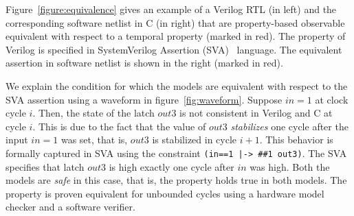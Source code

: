 \begin{example}
%
Figure~\ref{figure:equivalence} gives an example of a Verilog RTL (in left) and 
the corresponding software netlist in C (in right) that are 
property-based observable equivalent with respect to a temporal 
property (marked in red).  The property of Verilog 
is specified in SystemVerilog Assertion (SVA)~\cite{SVA} language.  
The equivalent assertion in software netlist is shown in the right (marked in red).  


We explain the condition for which the models are equivalent 
with respect to the SVA assertion using a waveform in figure~\ref{fig:waveform}.  
Suppose $in=1$ at clock cycle $i$. 
Then, the state of the latch $out3$ is not consistent in 
Verilog and C at cycle $i$.  This is due to the fact that 
the value of $out3$ \emph{stabilizes} one cycle after the 
input $in=1$ was set, that is, $out3$ is stabilized in cycle $i+1$.  
This behavior is formally captured 
in SVA using the constraint \texttt{(in==1 |-> \#\#1 out3)}.  The SVA 
specifies that latch $out3$ is high exactly one cycle after $in$ was high.  
Both the models are \emph{safe} in this case, that is, the property 
holds true in both models.  The property is proven equivalent for 
unbounded cycles using a hardware model checker and a software verifier.  
\end{example}
%



